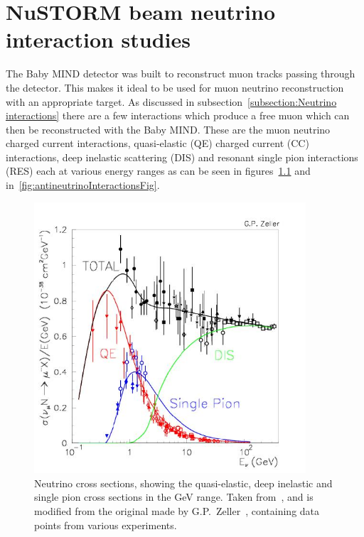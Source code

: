 \chapter{NuSTORM beam neutrino interaction studies}
\label{c:neutrinoNuSTORM}

The Baby MIND detector was built to reconstruct muon tracks passing through the detector. This makes it ideal to be used for muon neutrino reconstruction with an appropriate target. As discussed in subsection~\ref{subsection:Neutrino interactions} there are a few interactions which produce a free muon which can then be reconstructed with the Baby MIND. These are the muon neutrino charged current interactions, quasi-elastic (QE) charged current (CC) interactions, deep inelastic scattering (DIS) and resonant single pion interactions (RES) each at various energy ranges as can be seen in figures~\ref{fig:neutrinoInteractionsFig} and in~\ref{fig:antineutrinoInteractionsFig}.

\begin{figure}[h!]
\centering
\includegraphics[width=0.9\textwidth]{figures/figs_zeller-total-numode.png}
\caption{Neutrino cross sections, showing the quasi-elastic, deep inelastic and single pion cross sections in the GeV range. Taken from~\cite{82McFarland}, and is modified from the original made by G.P.~Zeller~\cite{106Zeller}, containing data points from various experiments.}
\label{fig:neutrinoInteractionsFig}
\end{figure}

